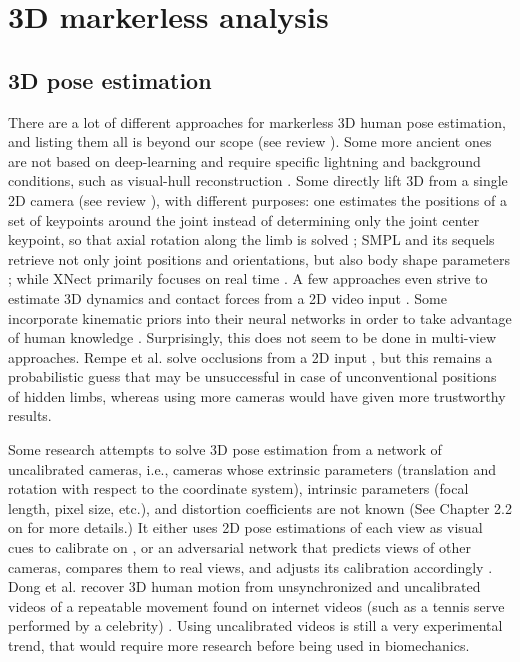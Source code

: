 \FloatBarrier
\section{3D markerless analysis} 
\subsection{3D pose estimation}

There are a lot of different approaches for markerless 3D human pose estimation, and listing them all is beyond our scope (see review \cite{Wang2021a}). Some more ancient ones are not based on deep-learning and require specific lightning and background conditions, such as visual-hull reconstruction \cite{Ceseracciu2014}. Some directly lift 3D from a single 2D camera (see review \cite{Liu2022b}), with different purposes: one estimates the positions of a set of keypoints around the joint instead of determining only the joint center keypoint, so that axial rotation along the limb is solved \cite{Fisch2020}; SMPL and its sequels retrieve not only joint positions and orientations, but also body shape parameters \cite{Loper2015}; while XNect primarily focuses on real time \cite{Mehta2020}. A few approaches even strive to estimate 3D dynamics and contact forces from a 2D video input \cite{Li2019,Rempe2021,Louis2022}. Some incorporate kinematic priors into their neural networks in order to take advantage of human knowledge \cite{Xu2020}. Surprisingly, this does not seem to be done in multi-view approaches. Rempe et al. solve occlusions from a 2D input \cite{Rempe2020}, but this remains a probabilistic guess that may be unsuccessful in case of unconventional positions of hidden limbs, whereas using more cameras would have given more trustworthy results. 

Some research attempts to solve 3D pose estimation from a network of uncalibrated cameras, i.e., cameras whose extrinsic parameters (translation and rotation with respect to the coordinate system), intrinsic parameters (focal length, pixel size, etc.), and distortion coefficients are not known (See Chapter 2.2 on  for more details.) It either uses 2D pose estimations of each view as visual cues to calibrate on \cite{Takahashi2018, Xu2021, Liu2022a}, or an adversarial network that predicts views of other cameras, compares them to real views, and adjusts its calibration accordingly \cite{Ershadi-Nasab2021}. Dong et al. recover 3D human motion from unsynchronized and uncalibrated videos of a repeatable movement found on internet videos (such as a tennis serve performed by a celebrity) \cite{Dong2020}. Using uncalibrated videos is still a very experimental trend, that would require more research before being used in biomechanics.

